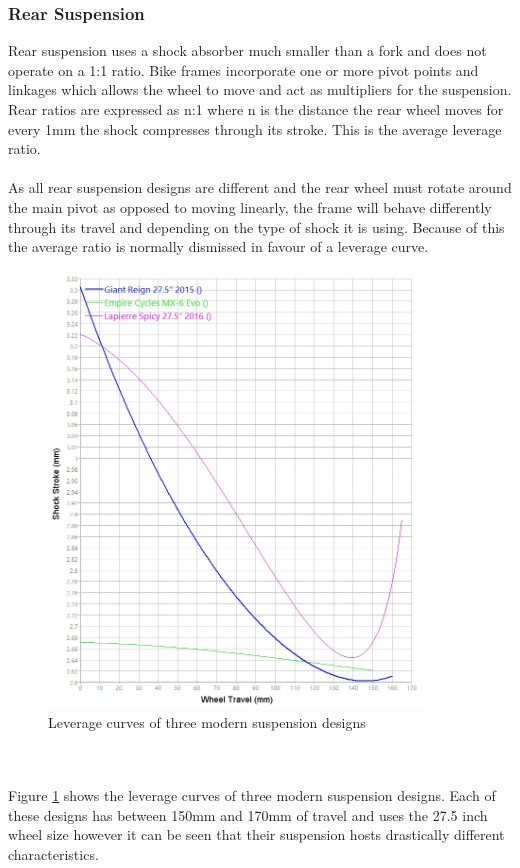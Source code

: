 \documentclass[a4paper, 12pt, hidelinks]{article}
\begin{document}
	\subsubsection{Rear Suspension}
		Rear suspension uses a shock absorber much smaller than a fork and does not operate on a 1:1 ratio. Bike frames incorporate one or more pivot points and linkages which allows the wheel to move and act as multipliers for the suspension. Rear ratios are expressed as n:1 where n is the distance the rear wheel moves for every 1mm the shock compresses through its stroke. This is the average leverage ratio.  
		\\\\
		As all rear suspension designs are different and the rear wheel must rotate around the main pivot as opposed to moving linearly, the frame will behave differently through its travel and depending on the type of shock it is using. Because of this the average ratio is normally dismissed in favour of a leverage curve.
		\begin{figure}[h!]
			\centering
			\includegraphics[width=10cm]{../images/3_bike_lev_ratio.jpg}
			\caption{Leverage curves of three modern suspension designs}
			\label{fig:3_bike_lev_ratio}
		\end{figure}
		\\\\
		Figure \ref{fig:3_bike_lev_ratio} shows the leverage curves of three modern suspension designs. Each of these designs has between 150mm and 170mm of travel and uses the 27.5 inch wheel size however it can be seen that their suspension hosts drastically different characteristics. 
\end{document}
